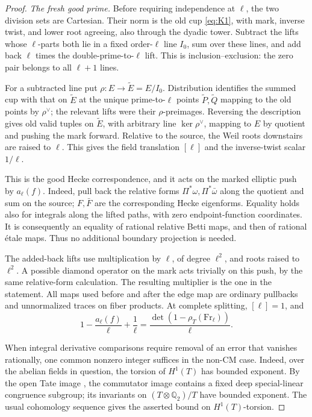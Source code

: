 \begin{proof}
\emph{The fresh good prime.}
Before requiring independence at \(\ell\), the two division sets are
Cartesian.  Their norm is the old cup \eqref{eq:K1}, with mark,
inverse twist, and lower root agreeing, also through the dyadic tower.
Subtract the lifts whose \(\ell\)-parts both lie in a fixed order-\(\ell\)
line \(I_0\), sum over these lines, and add back \(\ell\) times the
double-prime-to-\(\ell\) lift.  This is inclusion--exclusion: the zero
pair belongs to all \(\ell+1\) lines.

For a subtracted line put
\(\rho:E\to\widetilde E=E/I_0\).  Distribution identifies the summed
cup with that on \(\widetilde E\) at the unique prime-to-\(\ell\)
points \(\widetilde P,\widetilde Q\) mapping to the old points by
\(\rho^\vee\); the relevant lifts were their \(\rho\)-preimages.
Reversing the description gives old valid tuples on \(\widetilde E\),
with arbitrary line \(\ker\rho^\vee\), mapping to \(E\) by quotient and
pushing the mark forward.  Relative to the source, the Weil roots
downstairs are raised to \(\ell\).  This gives the field translation
\([\ell]\) and the inverse-twist scalar \(1/\ell\).

This is the good Hecke correspondence, and it acts on the marked
elliptic push by \(a_\ell(f)\).  Indeed, pull back the relative forms
\(\Pi^*\omega,\Pi^*\bar\omega\) along the quotient and sum on the source;
\(F,\bar F\) are the corresponding Hecke eigenforms.  Equality holds
also for integrals along the lifted paths, with zero endpoint-function
coordinates.  It is consequently an equality of rational relative
Betti maps, and then of rational étale maps.  Thus no additional
boundary projection is needed.

The added-back lifts use multiplication by \(\ell\), of degree
\(\ell^2\), and roots raised to \(\ell^2\).  A possible diamond operator
on the mark acts trivially on this push, by the same relative-form
calculation.  The resulting multiplier is the one in the statement.
All maps used before and after the edge map are ordinary pullbacks
and unnormalized traces on fiber products.  At complete splitting,
\([\ell]=1\), and
\[
 1-\frac{a_\ell(f)}{\ell}+\frac1\ell
                  =\frac{\det(1-\rho_T(\mathrm{Fr}_\ell))}{\ell}.
\]

When integral derivative comparisons require removal of an error that
vanishes rationally, one common nonzero integer suffices in the non-CM
case.  Indeed, over the abelian fields in question, the torsion of
\(H^1(T)\) has bounded exponent.  By the open Tate image
\cite{Serre72}, the commutator image contains a fixed deep special-linear
congruence subgroup; its invariants on
\((T\otimes\mathbb Q_2)/T\) have bounded exponent.  The usual
cohomology sequence gives the asserted bound on \(H^1(T)\)-torsion.


\end{proof}
